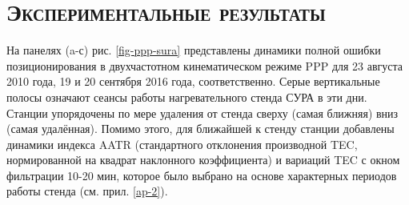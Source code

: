 \section{\textsc{Экспериментальные результаты}}

На панелях (a-с) рис. \ref{fig-ppp-sura} представлены динамики полной ошибки позиционирования в двухчастотном кинематическом режиме PPP для 23 августа 2010 года, 19 и 20 сентября 2016 года, соответственно.
Серые вертикальные полосы означают сеансы работы нагревательного стенда СУРА в эти дни.
Станции упорядочены по мере удаления от стенда сверху (самая ближняя) вниз (самая удалённая). 
Помимо этого, для ближайшей к стенду станции добавлены динамики индекса AATR \cite{Juan2018} (стандартного отклонения производной TEC, нормированной на квадрат наклонного коэффициента) и вариаций TEC с окном фильтрации 10-20 мин, которое было выбрано на основе характерных периодов работы стенда (см. прил. \ref{ap-2}).

